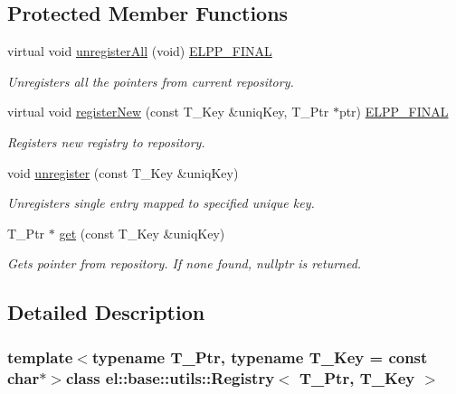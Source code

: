 \subsection*{Protected Member Functions}
\begin{DoxyCompactItemize}
\item 
virtual void \hyperlink{classel_1_1base_1_1utils_1_1_registry_ac40e62ddf5017beb91c28b472c9628c2}{unregister\+All} (void) \hyperlink{easylogging_09_09_8h_a2f812449f8d3355cf5b03ceb2ee5021b}{E\+L\+P\+P\+\_\+\+F\+I\+N\+A\+L}
\begin{DoxyCompactList}\small\item\em Unregisters all the pointers from current repository. \end{DoxyCompactList}\item 
virtual void \hyperlink{classel_1_1base_1_1utils_1_1_registry_ab10b3dd25ff0df036e7a015635a15dee}{register\+New} (const T\+\_\+\+Key \&uniq\+Key, T\+\_\+\+Ptr $\ast$ptr) \hyperlink{easylogging_09_09_8h_a2f812449f8d3355cf5b03ceb2ee5021b}{E\+L\+P\+P\+\_\+\+F\+I\+N\+A\+L}
\begin{DoxyCompactList}\small\item\em Registers new registry to repository. \end{DoxyCompactList}\item 
void \hyperlink{classel_1_1base_1_1utils_1_1_registry_aab6f0ce3a99feff11add0bd8b869fcb8}{unregister} (const T\+\_\+\+Key \&uniq\+Key)
\begin{DoxyCompactList}\small\item\em Unregisters single entry mapped to specified unique key. \end{DoxyCompactList}\item 
T\+\_\+\+Ptr $\ast$ \hyperlink{classel_1_1base_1_1utils_1_1_registry_a18c332267f2acbe78c97a611dec2e5c2}{get} (const T\+\_\+\+Key \&uniq\+Key)
\begin{DoxyCompactList}\small\item\em Gets pointer from repository. If none found, nullptr is returned. \end{DoxyCompactList}\end{DoxyCompactItemize}


\subsection{Detailed Description}
\subsubsection*{template$<$typename T\+\_\+\+Ptr, typename T\+\_\+\+Key = const char$\ast$$>$class el\+::base\+::utils\+::\+Registry$<$ T\+\_\+\+Ptr, T\+\_\+\+Key $>$}

